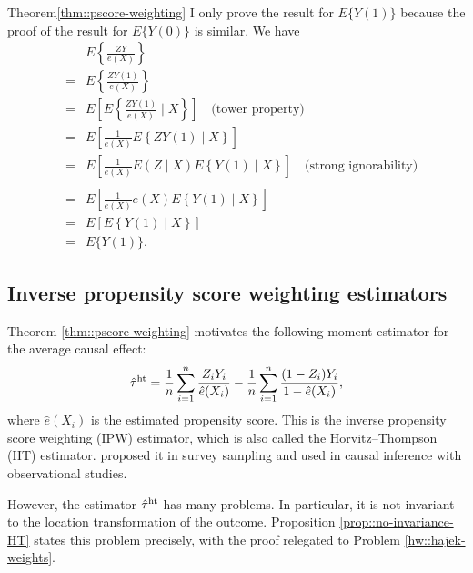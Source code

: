  

\begin{myproof}{Theorem}{\ref{thm::pscore-weighting}}
I only prove the result for $E\{ Y(1) \}$ because the proof of the result for $E\{ Y(0) \}$ is similar. We have
\begin{eqnarray*}
&&E\left\{  \frac{ZY}{e(X)}  \right\} \\
&=& E\left\{  \frac{ZY(1)}{e(X)}  \right\} \\
&=& E\left[ E\left\{  \frac{ZY(1)}{e(X)}  \mid X \right\}  \right]  \quad \text{(tower property)} \\
&=& E\left[  \frac{1}{e(X)}   E\left\{   ZY(1)  \mid X \right\}  \right]   \\
&=& E\left[  \frac{1}{e(X)}   E( Z  \mid X ) E\left\{   Y(1)  \mid X \right\}  \right]  \quad \text{(strong ignorability)} \\\\
&=& E\left[  \frac{1}{e(X)}   e(X) E\left\{   Y(1)  \mid X \right\}  \right] \\
&=& E\left[ E\left\{   Y(1)  \mid X \right\}  \right] \\
&=& E\{   Y(1) \}. 
\end{eqnarray*}
\end{myproof}



\subsection{Inverse propensity score weighting estimators}\label{sec::ipw-estimators}

Theorem \ref{thm::pscore-weighting} motivates the following moment estimator for the average causal effect:
$$
\hat{\tau}^\textup{ht} = \frac{1}{n} \sum_{i=1}^n \frac{Z_i Y_i}{ \hat{e}(X_i) }
- \frac{1}{n} \sum_{i=1}^n \frac{ (1-Z_i) Y_i}{ 1 - \hat{e}(X_i) } ,
$$
where $\hat{e}(X_i)$ is the estimated propensity score. This is the inverse propensity score weighting (IPW) estimator, which is also called the Horvitz--Thompson (HT) estimator. \citet{horvitz1952generalization} proposed it in survey sampling and \citet{rosenbaum1987model} used in causal inference with observational studies. 


However, the estimator $\hat{\tau}^\textup{ht}$ has many problems. In particular, it is not invariant to the location transformation of the outcome. 
Proposition \ref{prop::no-invariance-HT} states this problem precisely, with the proof relegated to Problem \ref{hw::hajek-weights}. 

